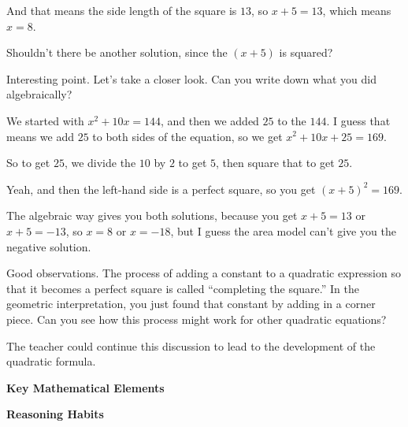 {\begin{scriptlist}
      \item [Student 1:] And that means the side length of the square is $13$, so $x + 5 = 13$, which means $x = 8$.
      
      \item [Student 2:] Shouldn't there be another solution, since the $(x + 5)$ is squared?
      
      \item [Teacher:] Interesting point. Let's take a closer look. Can you write down what you did algebraically?
      
      \item [Student 2:] We started with $x^2 + 10x = 144$, and then we added $25$ to the $144$. I guess that means we add $25$ to both sides of the equation, so we get $x^2 + 10x + 25 = 169$.\vspace{\baselineskip}
      
      \item [Student 1:] So to get $25$, we divide the $10$ by $2$ to get $5$, then square that to get $25$.
      
      \item [Student 2:] Yeah, and then the left-hand side is a perfect square, so you get $(x + 5)^2 = 169$.
      
      \item [Student 1:] The algebraic way gives you both solutions, because you get $x + 5 = 13$ or $x + 5 = -13$, so $x = 8$ or $x = -18$, but I guess the area model can't give you the negative solution.
      
      \item [Teacher:] Good observations. The process of adding a constant to a quadratic expression so that it becomes a perfect square is called ``completing the square.'' In the geometric interpretation, you just found that constant by adding in a corner piece. Can you see how this process might work for other quadratic equations?
    \end{scriptlist}\vspace{\baselineskip}

    The teacher could continue this discussion to lead to the development of the quadratic formula.

    \textbf{Key Mathematical Elements}

    \begin{hanglist}
    \end{hanglist}

    \textbf{Reasoning Habits}

    \begin{hanglist}


    \end{hanglist}    
  }
